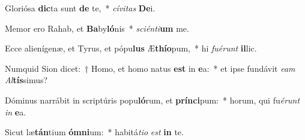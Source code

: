 \item Gloriósa \textbf{dic}ta sunt \textbf{de} te,~* \textit{cí}\textit{vi}\textit{tas} \textbf{De}i.
\item Memor ero Rahab, et \textbf{Ba}by\textbf{ló}nis~* \textit{sci}\textit{én}\textit{ti}\textbf{um} me.
\item Ecce alienígenæ, et Tyrus, et pópu\textbf{lus} Æ\textbf{thí}\textbf{o}pum,~* hi \textit{fu}\textit{é}\textit{runt} \textbf{il}lic.
\item Numquid Sion dicet:~† Homo, et homo natus \textbf{est} in \textbf{e}a:~* et ipse fundávit \textit{e}\textit{am} \textit{Al}\textbf{tís}simus?
\item Dóminus narrábit in scriptúris popu\textbf{ló}rum, et \textbf{prín}\textbf{ci}pum:~* horum, qui fu\textit{é}\textit{runt} \textit{in} \textbf{e}a.
\item Sicut læ\textbf{tán}tium \textbf{óm}\textbf{ni}um:~* habitá\textit{ti}\textit{o} \textit{est} \textbf{in} te.

